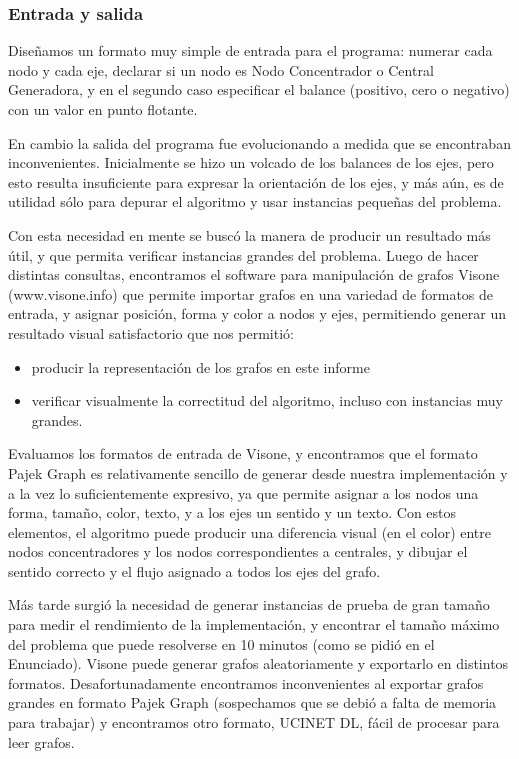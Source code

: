 \subsubsection{Entrada y salida}

Dise\~namos un formato muy simple de entrada para el programa: numerar cada nodo y cada eje, declarar si un nodo es Nodo Concentrador o Central Generadora, y en el segundo caso especificar el balance (positivo, cero o negativo) con un valor en punto flotante.

En cambio la salida del programa fue evolucionando a medida que se encontraban inconvenientes. Inicialmente se hizo un volcado de los balances de los ejes, pero esto resulta insuficiente para expresar la orientaci\'on de los ejes, y m\'as a\'un, es de utilidad s\'olo para depurar el algoritmo y usar instancias peque\~nas del problema.

Con esta necesidad en mente se busc\'o la manera de producir un resultado m\'as \'util, y que permita verificar instancias grandes del problema. Luego de hacer distintas consultas, encontramos el software para manipulaci\'on de grafos Visone (www.visone.info) que permite importar grafos en una variedad de formatos de entrada, y asignar posici\'on, forma y color a nodos y ejes, permitiendo generar un resultado visual satisfactorio que nos permiti\'o:
\begin{itemize}
\item producir la representaci\'on de los grafos en este informe
\item verificar visualmente la correctitud del algoritmo, incluso con instancias muy grandes.
\end{itemize}

Evaluamos los formatos de entrada de Visone, y encontramos que el formato Pajek Graph es relativamente sencillo de generar desde nuestra implementaci\'on y a la vez lo suficientemente expresivo, ya que permite asignar a los nodos una forma, tama\~no, color, texto, y a los ejes un sentido y un texto. Con estos elementos, el algoritmo puede producir una diferencia visual (en el color) entre nodos concentradores y los nodos correspondientes a centrales, y dibujar el sentido correcto y el flujo asignado a todos los ejes del grafo.

M\'as tarde surgi\'o la necesidad de generar instancias de prueba de gran tama\~no para medir el rendimiento de la implementaci\'on, y encontrar el tama\~no m\'aximo del problema que puede resolverse en 10 minutos (como se pidi\'o en el Enunciado). Visone puede generar grafos aleatoriamente y exportarlo en distintos formatos. Desafortunadamente encontramos inconvenientes al exportar grafos grandes en formato Pajek Graph (sospechamos que se debi\'o a falta de memoria para trabajar) y encontramos otro formato, UCINET DL, f\'acil de procesar para leer grafos.

